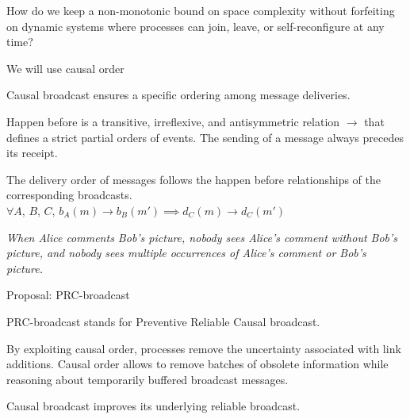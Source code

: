 \documentclass[10pt, xcolor={usenames, dvipsnames}]{beamer}
\begin{document}
\begin{frame}[standout]
  
  How do we keep a non-monotonic bound on space complexity without forfeiting on
  dynamic systems where processes can join, leave, or self-reconfigure at any
  time?

\end{frame}


\begin{frame}{We will use causal order}

  Causal broadcast ensures a specific ordering among message deliveries.
  
  \begin{definition}
    Happen before is a transitive, irreflexive, and antisymmetric relation
    $\rightarrow$ that defines a strict partial orders of events.  The sending
    of a message always precedes its receipt.
  \end{definition}

  \vspace{2em}

  \begin{definition}
    The delivery order of messages follows the happen before relationships of the
    corresponding broadcasts. $\forall A,\,B,\,C,\,
    b_A(m) \rightarrow b_B(m') \implies d_C(m) \rightarrow d_C(m')$
  \end{definition}

  \textit{When Alice comments Bob's picture, nobody sees Alice's comment without
    Bob's picture, and nobody sees multiple occurrences of Alice's comment or
    Bob's picture.}

\end{frame}

\begin{frame}{Proposal: PRC-broadcast}

  PRC-broadcast stands for Preventive Reliable Causal broadcast. 
  
  \vspace{2em}

  By exploiting causal order, processes remove the uncertainty associated with
  link additions. Causal order allows to remove batches of obsolete information
  while reasoning about temporarily buffered broadcast messages.
  
  \vspace{1em}
  
  Causal broadcast improves its underlying reliable broadcast.

\end{frame}
\end{document}
